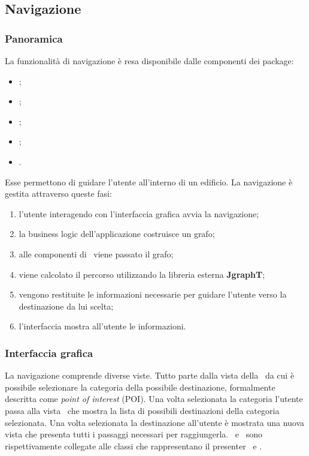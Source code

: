 \documentclass[../Funzionalita.tex]{subfiles}
\begin{document}
\subsection{Navigazione}
\label{subsec:Navigazione}

		\subsubsection{Panoramica}
			La funzionalità di navigazione è resa disponibile dalle componenti dei package:
			\begin{itemize}
				\item \navigator;
				\item \beacon;
				\item \compass;
				\item \dataaccess;
				\item \usersetting.
			\end{itemize}
			Esse permettono di guidare l'utente all'interno di un edificio.
			La navigazione è gestita attraverso queste fasi:
			\begin{enumerate}
				\item l'utente interagendo con l'interfaccia grafica avvia la navigazione;
				\item la business logic dell'applicazione costruisce un grafo;
				\item alle componenti di \navigator\ viene passato il grafo;
				\item viene calcolato il percorso utilizzando la libreria esterna \textbf{JgraphT};
				\item vengono restituite le informazioni necessarie per guidare l'utente verso la destinazione da lui scelta;
				\item l'interfaccia mostra all'utente le informazioni.
			\end{enumerate}
			
		\newpage
		\subsubsection{Interfaccia grafica}
			La navigazione comprende diverse viste. Tutto parte dalla vista della \HomeView\ da cui è possibile selezionare la categoria della possibile destinazione, formalmente descritta come \textit{point of interest} (POI). Una volta selezionata la categoria l'utente passa alla vista \PoiCategoryViewImp\ che mostra  la lista di possibili destinazioni della categoria selezionata. Una volta selezionata la destinazione all'utente è mostrata una nuova vista che presenta tutti i passaggi necessari per raggiungerla. \NavigationView\ e \PoiCategoryView\ sono rispettivamente collegate alle classi che rappresentano il presenter \NavigationActivity\ e \PoiCategoryActivity.
			
\end{document}
